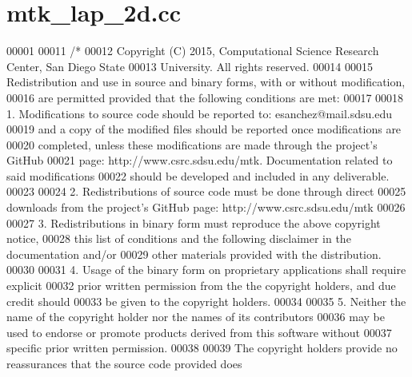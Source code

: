 \hypertarget{mtk__lap__2d_8cc_source}{\section{mtk\+\_\+lap\+\_\+2d.\+cc}
\label{mtk__lap__2d_8cc_source}
}

\begin{DoxyCode}
00001 
00011 \textcolor{comment}{/*}
00012 \textcolor{comment}{Copyright (C) 2015, Computational Science Research Center, San Diego State}
00013 \textcolor{comment}{University. All rights reserved.}
00014 \textcolor{comment}{}
00015 \textcolor{comment}{Redistribution and use in source and binary forms, with or without modification,}
00016 \textcolor{comment}{are permitted provided that the following conditions are met:}
00017 \textcolor{comment}{}
00018 \textcolor{comment}{1. Modifications to source code should be reported to: esanchez@mail.sdsu.edu}
00019 \textcolor{comment}{and a copy of the modified files should be reported once modifications are}
00020 \textcolor{comment}{completed, unless these modifications are made through the project's GitHub}
00021 \textcolor{comment}{page: http://www.csrc.sdsu.edu/mtk. Documentation related to said modifications}
00022 \textcolor{comment}{should be developed and included in any deliverable.}
00023 \textcolor{comment}{}
00024 \textcolor{comment}{2. Redistributions of source code must be done through direct}
00025 \textcolor{comment}{downloads from the project's GitHub page: http://www.csrc.sdsu.edu/mtk}
00026 \textcolor{comment}{}
00027 \textcolor{comment}{3. Redistributions in binary form must reproduce the above copyright notice,}
00028 \textcolor{comment}{this list of conditions and the following disclaimer in the documentation and/or}
00029 \textcolor{comment}{other materials provided with the distribution.}
00030 \textcolor{comment}{}
00031 \textcolor{comment}{4. Usage of the binary form on proprietary applications shall require explicit}
00032 \textcolor{comment}{prior written permission from the the copyright holders, and due credit should}
00033 \textcolor{comment}{be given to the copyright holders.}
00034 \textcolor{comment}{}
00035 \textcolor{comment}{5. Neither the name of the copyright holder nor the names of its contributors}
00036 \textcolor{comment}{may be used to endorse or promote products derived from this software without}
00037 \textcolor{comment}{specific prior written permission.}
00038 \textcolor{comment}{}
00039 \textcolor{comment}{The copyright holders provide no reassurances that the source code provided does}

\end{DoxyCode}
